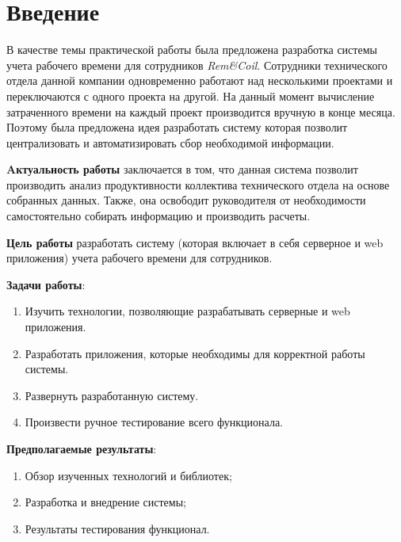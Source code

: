 \chapter*{Введение}

В качестве темы практической работы была предложена разработка системы учета рабочего времени для сотрудников \textit{Rem\&Coil}. Сотрудники технического отдела данной компании одновременно работают над несколькими проектами и переключаются с одного проекта на другой. На данный момент вычисление затраченного времени на каждый проект производится вручную в конце месяца. Поэтому была предложена идея разработать систему которая позволит централизовать и автоматизировать сбор необходимой информации.

\textbf{Aктуальность работы} заключается в том, что данная система позволит производить анализ продуктивности коллектива технического отдела на основе собранных данных. Также, она освободит руководителя от необходимости самостоятельно собирать информацию и производить расчеты. 

\textbf{Цель работы} разработать систему (которая включает в себя серверное и web приложения) учета рабочего времени для сотрудников. 

\textbf{Задачи работы}:
\begin{enumerate}
	\item Изучить технологии, позволяющие разрабатывать серверные и web приложения.
	\item Разработать приложения, которые необходимы для корректной работы системы.
	\item Развернуть разработанную систему.
	\item Произвести ручное тестирование всего функционала.
\end{enumerate} 

\textbf{Предполагаемые результаты}:
\begin{enumerate}
	\item Обзор изученных технологий и библиотек;
	\item Разработка и внедрение системы;
	\item Результаты тестирования функционал. 
\end{enumerate}

\newpage